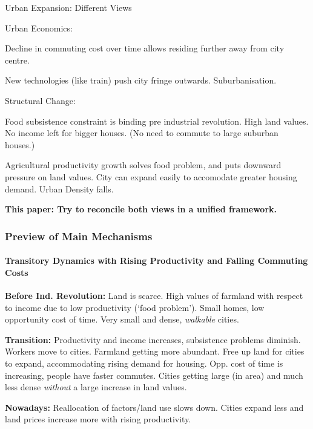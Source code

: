 \documentclass[aspectratio=169]{beamer}
\begin{document}
\begin{frame}{Urban Expansion: Different Views}

\begin{widee}

\item Urban Economics:
\begin{midi}
\item Decline in commuting cost over time allows residing further away from city centre.
\item New technologies (like train) push city fringe outwards. Suburbanisation.
\end{midi}

\pause

\item Structural Change: 
\begin{midi}
\item Food subsistence constraint is binding pre industrial revolution. High land values. No income left for bigger houses. (No need to commute to large suburban houses.)
\item Agricultural productivity growth solves food problem, and puts downward pressure on land values. City can expand easily to accomodate greater housing demand. Urban Density falls.
\end{midi}
\end{widee}

\pause

\begin{center}
	\textbf{This paper: Try to reconcile both views in a unified framework.}
\end{center}

\end{frame}

\begin{v75mins}
\begin{frame}
\frametitle{Preview of Main Mechanisms}
\framesubtitle{Transitory Dynamics with Rising Productivity and Falling Commuting Costs}

\begin{widei}
\item<1-> \textbf{Before Ind. Revolution:} Land is scarce. High values of farmland with respect to income due to low productivity (`food problem'). Small homes, low opportunity cost of time. Very small and dense, \emph{walkable} cities.
\item<2-> \textbf{Transition:} Productivity and income increases, subsistence problems diminish. Workers move to cities. Farmland getting more abundant. Free up land for cities to expand, accommodating rising demand for housing. Opp. cost of time is increasing, people have faster commutes. Cities getting large (in area) and much less dense \emph{without} a large increase in land values.
\item<3-> \textbf{Nowadays:} Reallocation of factors/land use slows down. Cities expand less and land prices increase more with rising productivity.
\end{widei}
\end{frame}
\end{v75mins}
\end{document}
